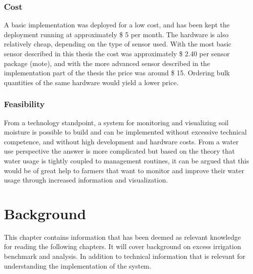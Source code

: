\documentclass[]{uiophd}
\begin{document}
\subsection{Cost}
A basic implementation was deployed for a low cost, and has been kept the deployment running at approximately \$ 5 per month. The hardware is also relatively cheap, depending on the type of sensor used. With the most basic sensor described in this thesis the cost was approximately \$ 2.40 per sensor package (mote), and with the more advanced sensor described in the implementation part of the thesis the price was around \$ 15. Ordering bulk quantities of the same hardware would yield a lower price.

\subsection{Feasibility}
From a technology standpoint, a system for monitoring and visualizing soil moisture is possible to build and can be implemented without excessive technical competence, and without high development and hardware costs. From a water use perspective the answer is more complicated but based on the theory that water usage is tightly coupled to management routines, it can be argued that this would be of great help to farmers that want to monitor and improve their water usage through increased information and visualization.


\chapter{Background}

This chapter contains information that has been deemed as relevant knowledge for reading the  following chapters. It will cover background on excess irrigation benchmark and analysis. In addition to technical information that is relevant for understanding the implementation of the system.
\end{document}

